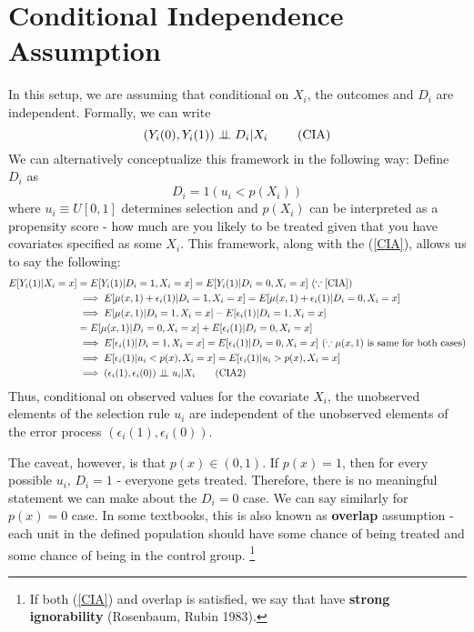 \section{Conditional Independence Assumption}
In this setup, we are assuming that conditional on $X_i$, the outcomes and $D_i$ are independent. Formally, we can write
\[
 (Y_i(0), Y_i(1)) \perp \!\!\! \perp D_i|X_i \ \tag{\text{CIA}}\label{CIA}
\]
We can alternatively conceptualize this framework in the following way: Define $D_i$ as
\[
D_i = 1(u_i<p(X_i))
\]
where $u_i\equiv U[0,1]$ determines selection and $p(X_i)$ can be interpreted as a propensity score - how much are you likely to be treated given that you have covariates specified as some $X_i$. This framework, along with the (\ref{CIA}), allows us to say the following:
\footnotesize{\begin{align*}
E[Y_i(1)|X_i=x]&=E[Y_i(1)|D_i=1,X_i=x]=E[Y_i(1)|D_i=0,X_i=x] \ (\because \ref{CIA})\\
&\implies E[\mu(x,1)+\epsilon_i(1)|D_i=1,X_i=x]=E[\mu(x,1)+\epsilon_i(1)|D_i=0,X_i=x]\\
&\implies E[\mu(x,1)|D_i=1,X_i=x]-E[\epsilon_i(1)|D_i=1,X_i=x]\\
&=E[\mu(x,1)|D_i=0,X_i=x]+E[\epsilon_i(1)|D_i=0,X_i=x]\\
&\implies E[\epsilon_i(1)|D_i=1,X_i=x]=E[\epsilon_i(1)|D_i=0,X_i=x]\ (\because \mu(x,1)\text{ is same for both cases})\\
&\implies E[\epsilon_i(1)|u_i<p(x),X_i=x]=E[\epsilon_i(1)|u_i>p(x),X_i=x]\\
&\implies (\epsilon_i(1), \epsilon_i(0))\perp \!\!\! \perp u_i|X_i \tag{\text{CIA2}}\label{CIA2}
\end{align*}}\normalsize
Thus, conditional on observed values for the covariate $X_i$, the unobserved elements of the selection rule $u_i$ are independent of the unobserved elements of the error process $(\epsilon_i(1), \epsilon_i(0))$.\par
 The caveat, however, is that $p(x)\in(0,1)$. If $p(x)=1$, then for every possible $u_i$, $D_i=1$ - everyone gets treated. Therefore, there is no meaningful statement we can make about the $D_i=0$ case. We can say similarly for $p(x)=0$ case. In some textbooks, this is also known as \textbf{overlap} assumption - each unit in the defined population should have some chance of being treated and some chance of being in the control group. \footnote{If both (\ref{CIA}) and overlap is satisfied, we say that have \textbf{strong ignorability} (Rosenbaum, Rubin 1983).} \par
